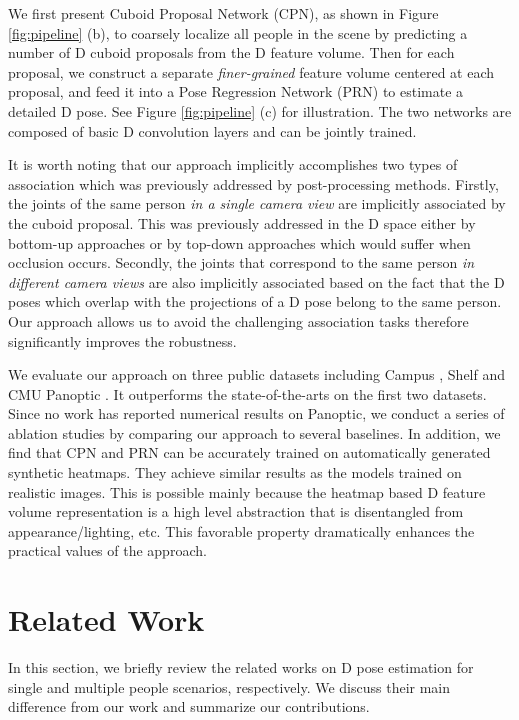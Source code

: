 \documentclass[runningheads]{llncs}
\begin{document}
We first present Cuboid Proposal Network (CPN), as shown in Figure \ref{fig:pipeline} (b), to coarsely localize all people in the scene by predicting a number of D cuboid proposals from the D feature volume. Then for each proposal, we construct a separate \emph{finer-grained} feature volume centered at each proposal, and feed it into a Pose Regression Network (PRN) to estimate a detailed D pose. See Figure \ref{fig:pipeline} (c) for illustration. The two networks are composed of basic D convolution layers and can be jointly trained. 

It is worth noting that our approach implicitly accomplishes two types of association which was previously addressed by post-processing methods. Firstly, the joints of the same person \emph{in a single camera view} are implicitly associated by the cuboid proposal. This was previously addressed in the D space either by bottom-up approaches \cite{cao2017realtime,newell2017associative} or by top-down approaches \cite{sun2019deep} which would suffer when occlusion occurs. Secondly, the joints that correspond to the same person \emph{in different camera views} are also implicitly associated based on the fact that the D poses which overlap with the projections of a D pose belong to the same person. Our approach allows us to avoid the challenging association tasks therefore significantly improves the robustness.

We evaluate our approach on three public datasets including Campus \cite{belagiannis20143d}, Shelf \cite{belagiannis20143d} and CMU Panoptic \cite{Joo_2017_TPAMI}. It outperforms the state-of-the-arts on the first two datasets. Since no work has reported numerical results on Panoptic, we conduct a series of ablation studies by comparing our approach to several baselines. In addition, we find that CPN and PRN can be accurately trained on automatically generated synthetic heatmaps. They achieve similar results as the models trained on realistic images. This is possible mainly because the heatmap based D feature volume representation is a high level abstraction that is disentangled from appearance/lighting, etc. This favorable property dramatically enhances the practical values of the approach.

\section{Related Work}
In this section, we briefly review the related works on D pose estimation for single and multiple people scenarios, respectively. We discuss their main difference from our work and summarize our contributions.
\end{document}
